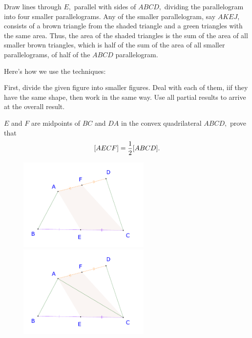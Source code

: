 \documentclass{article}
\begin{document}
\begin{soln}
    Draw lines through $E,$ parallel with sides of $ABCD,$ dividing the parallelogram into four smaller parallelograms.
    Any of the smaller parallelogram, say $AKEJ$, consists of a brown triangle from the shaded triangle and a green triangles with the same area.
    Thus, the area of the shaded triangles is the sum of the area of all smaller brown triangles, which is half of the sum of the area of all smaller parallelograms,
    of half of the $ABCD$ parallelogram.
\end{soln}

\begin{remark*}
    Here's how we use the techniques:
    \begin{enumerate}[topsep=0pt, partopsep=0pt, itemsep=0pt]
        \ii First, divide the given figure into smaller figures.
        \ii Deal with each of them, iif they have the same shape, then work in the same way.
        \ii Use all partial results to arrive at the overall result.
    \end{enumerate}
\end{remark*}

\newpage

\begin{example*}[Example 2]
    $E$ and $F$ are midpoints of $BC$ and $DA$ in the convex quadrilateral $ABCD,$ prove that
    \[
        [AECF] = \frac{1}{2} [ABCD].
    \]
\end{example*}

\begin{figure}[h]
    \centering
    \begin{minipage}[t]{6.5cm}
        \begin{center}
            \includegraphics[width=6.5cm]{./svg/pdf/23-24-s3-i-p2.pdf}
        \end{center}
    \end{minipage}
    \qquad
    \begin{minipage}[t]{6.5cm}
        \centering
        \begin{center}
            \includegraphics[width=6.5cm]{./svg/pdf/23-24-s3-i-p2-s.pdf}
        \end{center}
    \end{minipage}
\end{figure}
\end{document}

